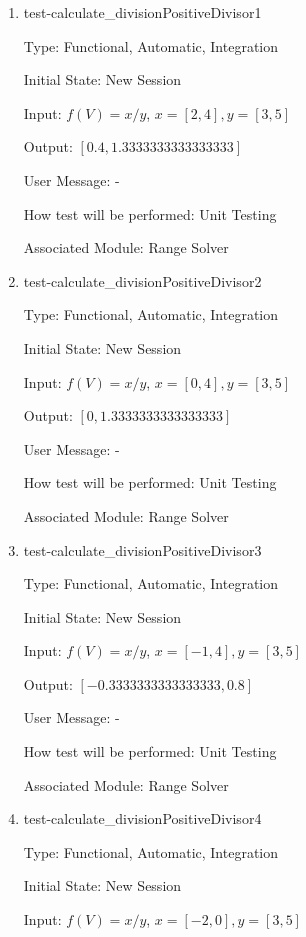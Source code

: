 \documentclass[12pt, titlepage]{article}
\begin{document}
\begin{enumerate}
	
	\item{test-calculate\_divisionPositiveDivisor1}
	
	Type: Functional, Automatic, Integration
	
	Initial State: New Session
	
	Input: $f(V) = x / y$, $x = [2,4], y = [3,5]$
	
	Output: $[0.4,1.3333333333333333]$
	
	User Message: - 
	
	How test will be performed: Unit Testing
	
	Associated Module: Range Solver\\
	
	\item{test-calculate\_divisionPositiveDivisor2}
	
	Type: Functional, Automatic, Integration
	
	Initial State: New Session
	
	Input: $f(V) = x / y$, $x = [0,4], y = [3,5]$
	
	Output: $[0, 1.3333333333333333]$
	
	User Message: - 
	
	How test will be performed: Unit Testing
	
	Associated Module: Range Solver\\
	
	\item{test-calculate\_divisionPositiveDivisor3}
	
	Type: Functional, Automatic, Integration
	
	Initial State: New Session
	
	Input: $f(V) = x / y$, $x = [-1,4], y = [3,5]$
	
	Output: $[-0.3333333333333333,0.8]$
	
	User Message: - 
	
	How test will be performed: Unit Testing
	
	Associated Module: Range Solver\\

	\item{test-calculate\_divisionPositiveDivisor4}
	
	Type: Functional, Automatic, Integration
	
	Initial State: New Session
	
	Input: $f(V) = x / y$, $x = [-2,0], y = [3,5]$
	

\end{enumerate}
\end{document}
